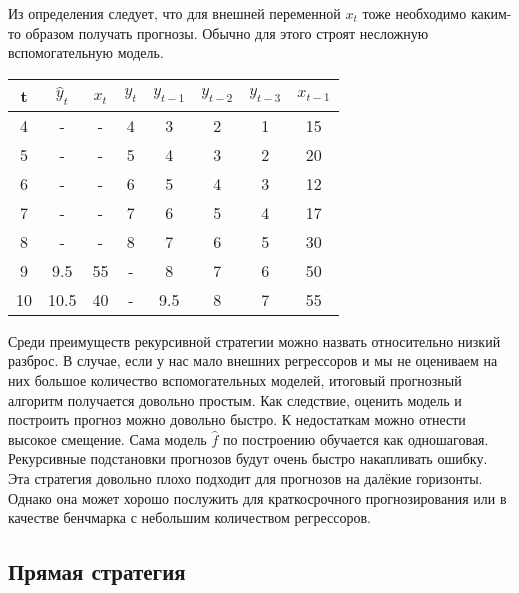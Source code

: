 \documentclass[12pt,fleqn]{article}
\begin{document}
Из определения следует, что для внешней переменной $x_t$ тоже необходимо каким-то образом получать прогнозы. Обычно для этого строят несложную вспомогательную модель.

\begin{table}[!h]
	\centering
	\begin{tabular}{|c|c|c|c|cccc|}
		\hline
		t  & $\hat{y}_t$ & $\hat{x}_t$ & \textbf{$y_t$} & \textbf{$y_{t-1}$} & $y_{t-2}$ & $y_{t-3}$ & $x_{t-1}$ \\ \hline
		4  & -           & -           & 4              & 3                  & 2         & 1         & 15        \\
		5  & -           & -           & 5              & 4                  & 3         & 2         & 20        \\
		6  & -           & -           & 6              & 5                  & 4         & 3         & 12        \\
		7  & -           & -           & 7              & 6                  & 5         & 4         & 17        \\
		8  & -           & -           & 8              & 7                  & 6         & 5         & 30        \\ \hline
		9  & 9.5         & 55          & -              & 8                  & 7         & 6         & 50        \\
		10 & 10.5        & 40          & -              & 9.5                & 8         & 7         & 55        \\ \hline
	\end{tabular}
\end{table}

Среди преимуществ рекурсивной стратегии можно назвать относительно низкий разброс. В случае, если у нас мало внешних регрессоров и мы не оцениваем на них большое количество вспомогательных моделей, итоговый прогнозный алгоритм получается довольно простым. Как следствие, оценить модель и построить прогноз можно довольно быстро. К недостаткам можно отнести высокое смещение. Сама модель $\hat{f}$ по построению обучается как одношаговая. Рекурсивные подстановки прогнозов будут очень быстро накапливать ошибку. Эта стратегия довольно плохо подходит для прогнозов на далёкие горизонты. Однако она может хорошо послужить для краткосрочного прогнозирования или в качестве бенчмарка с небольшим количеством регрессоров.

\newpage
\subsection{Прямая стратегия}
\end{document}
